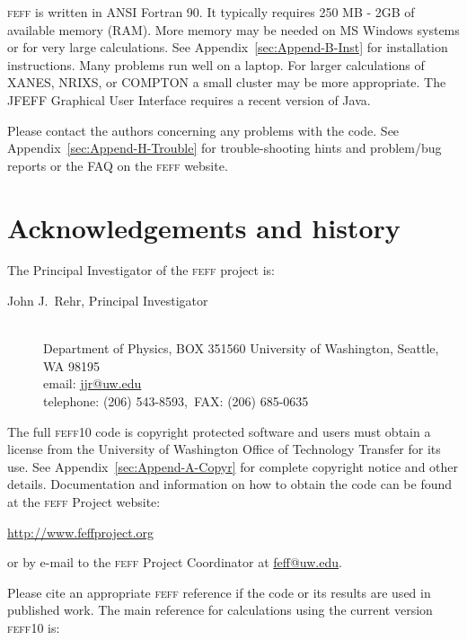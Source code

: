 \documentclass[11pt,oneside]{report} %
\renewcommand{\htmladdnormallink}[2]{\href{#2}{#1}}
\renewcommand{\htmlref}[2]{\hyperlink{#2}{#1}}
\newcommand{\program}[1]{\textsc{#1}}
\newcommand{\feff}{\program{feff}}
\newcommand{\vnum}{10}
\newcommand{\feffcur}{\feff\vnum}
\renewcommand{\htmlref}[2]{{#1}} %
\begin{document}
\begin{latexonly}
{\feff} is written in ANSI Fortran 90. It typically requires 250 MB - 2GB of available memory (RAM). More memory may be needed on MS Windows systems or for very large calculations.  See Appendix~\ref{sec:Append-B-Inst} for installation instructions.  Many problems run well on a laptop.  For larger calculations of XANES, NRIXS, or COMPTON a small cluster may be more appropriate.  The JFEFF Graphical User Interface requires a recent version of Java.

Please contact the authors concerning any problems with the code. See
Appendix~\ref{sec:Append-H-Trouble} for trouble-shooting hints and
problem/bug reports or the FAQ on the \htmlref{{\feff} website}
  {http://www.feffproject.org}.




\section{Acknowledgements and history}
\label{Acknowledgements}

The Principal Investigator of the {\feff} project is:
\begin{description}
\item[John J.~Rehr, Principal Investigator]\hfill\\
Department of Physics, BOX 351560 University of Washington, Seattle, WA 98195\\
email: \htmladdnormallink{jjr@uw.edu}
{mailto:jjr@phys.washington.edu}\\
telephone: (206) 543-8593,\  FAX: (206) 685-0635
\end{description}


The full {\feffcur} code is copyright protected software and users must
obtain a license from the University of Washington Office of Technology
Transfer for its use. 
See Appendix~\ref{sec:Append-A-Copyr} for
complete copyright notice and other details. Documentation and
information on how to obtain the code can be found at the {\feff}
Project website:

\centerline{\htmladdnormallink{http://www.feffproject.org}
  {http://www.feffproject.org}}

\noindent or by e-mail to the {\feff} Project Coordinator at
\htmladdnormallink{feff@uw.edu}{mailto:feff@uw.edu}.

Please cite an appropriate {\feff} reference if the code
or its results are used in published work. The main reference for calculations using the current version {\feffcur}  is:


\end{latexonly}
\end{document}
